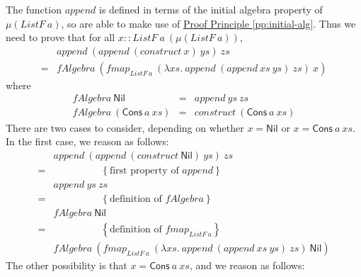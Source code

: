 \documentclass{jfp1}
\newcommand{\eqAnnotation}[1]{\hspace{2cm}\left\{\textrm{#1}\right\}}
\newcommand{\proofprinref}[1]{\hyperref[#1]{Proof Principle \ref*{#1}}}
\begin{document}
\begin{proof*}
  The function $\mathit{append}$ is defined in terms of the initial
  algebra property of $\mu(\mathit{ListF}~a)$, so are able to
  make use of \proofprinref{pp:initial-alg}. Thus we need to prove
  that for all $x ::
  \mathit{ListF}~a~(\mu(\mathit{ListF}~a))$,
  \begin{displaymath}
    \begin{array}{cl}
      &\mathit{append}~(\mathit{append}~(\mathit{construct}~x)~\mathit{ys})~\mathit{zs}\\
      =&\mathit{fAlgebra}~(\mathit{fmap}_{\mathit{ListF}~a}~(\lambda \mathit{xs}.~\mathit{append}~(\mathit{append}~\mathit{xs}~\mathit{ys})~\mathit{zs})~x)
    \end{array}
  \end{displaymath}
  where
  \begin{displaymath}
    \begin{array}{rcl}
      \mathit{fAlgebra}~\mathsf{Nil} &=& \mathit{append}~\mathit{ys}~\mathit{zs} \\
      \mathit{fAlgebra}~(\mathsf{Cons}~a~\mathit{xs}) &=& \mathit{construct}~(\mathsf{Cons}~a~\mathit{xs})
    \end{array}
  \end{displaymath}
  There are two cases to consider, depending on whether $x =
  \mathsf{Nil}$ or $x = \mathsf{Cons}~a~\mathit{xs}$. In the first
  case, we reason as follows:
  \begin{displaymath}
    \begin{array}{cl}
      & \mathit{append}~(\mathit{append}~(\mathit{construct}~\mathsf{Nil})~\mathit{ys})~\mathit{zs}\\
      =&\eqAnnotation{first property of $\mathit{append}$} \\
      & \mathit{append}~\mathit{ys}~\mathit{zs} \\
      =&\eqAnnotation{definition of $\mathit{fAlgebra}$} \\
      & \mathit{fAlgebra}~\mathsf{Nil} \\
      =&\eqAnnotation{definition of $\mathit{fmap}_{\mathit{ListF}~a}$} \\
      & \mathit{fAlgebra}~(\mathit{fmap}_{\mathit{ListF}~a}~(\lambda \mathit{xs}.~\mathit{append}~(\mathit{append}~\mathit{xs}~\mathit{ys})~\mathit{zs})~\mathsf{Nil})
    \end{array}
  \end{displaymath}
  The other possibility is that $x = \mathsf{Cons}~a~\mathit{xs}$, and
  we reason as follows:

\end{proof*}
\end{document}
